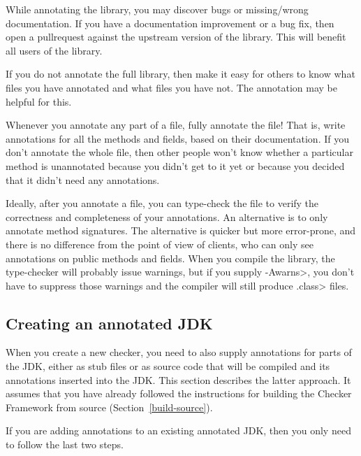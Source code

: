 While annotating the library, you may discover bugs or missing/wrong
documentation.  If you have a documentation improvement or a bug fix, then
open a pullrequest against the upstream version of the library.  This will
benefit all users of the library.

If you do not annotate the full library, then make it easy for others to
know what files you have annotated and what files you have not.  The
 annotation may be helpful for
this.

Whenever you annotate any part of a file, fully annotate the file!  That
is, write annotations for all the methods and fields, based on their
documentation.  If you don't annotate the whole file, then other people
won't know whether a particular method is unannotated because you didn't
get to it yet or because you decided that it didn't need any annotations.

Ideally, after you annotate a file, you can type-check the file to verify
the correctness and completeness of your annotations.  An alternative is to
only annotate method signatures.  The alternative is quicker but more
error-prone, and there is no difference from the point of view of clients,
who can only see annotations on public methods and fields.  When you
compile the library, the type-checker will probably issue warnings, but if
you supply \<-Awarns>, you don't have to suppress those warnings and the
compiler will still produce \<.class> files.


\subsection{Creating an annotated JDK\label{annotating-jdk}}

When you create a new checker, you need to also supply annotations for
parts of the JDK, either as stub files or as source code that will be
compiled and its annotations inserted into the JDK\@.  This
section describes the latter approach.
It assumes that you have already followed the instructions for building the
Checker Framework from source (Section~\ref{build-source}).

If you are adding annotations to an existing annotated JDK, then you only
need to follow the last two steps.


